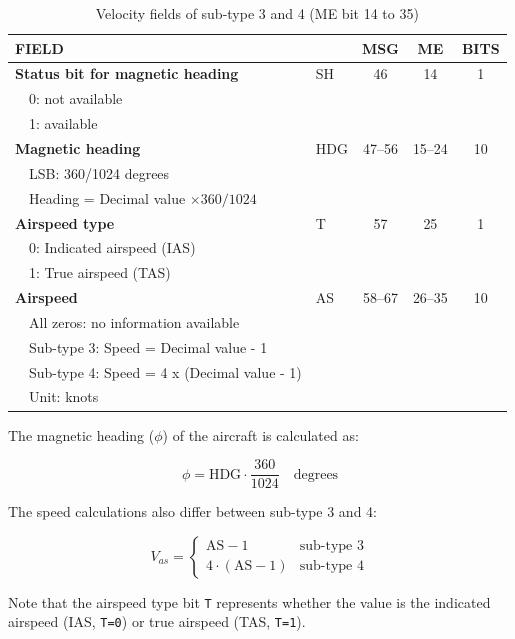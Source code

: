 \begin{table}[ht]
\caption{Velocity fields of sub-type 3 and 4 (ME bit 14 to 35)}
\label{tb:adsb-velocity-bits-14-35-as}
\footnotesize
\begin{tabular}{|l|l|c|c|c|}
\hline
\textbf{FIELD} & & \textbf{MSG} & \textbf{ME} & \textbf{BITS} \\ \hline
\textbf{Status bit for magnetic heading}  & SH & 46 & 14 & 1\\
~~0: not available &&&& \\
~~1: available &&&& \\ \hline
\textbf{Magnetic heading} & HDG & 47--56 & 15--24 & 10 \\
~~LSB: 360/1024 degrees &&&& \\
~~Heading = Decimal value $\times 360 / 1024$ &&&& \\ \hline
\textbf{Airspeed type} & T & 57 & 25 & 1\\
~~0: Indicated airspeed (IAS) &&&& \\
~~1: True airspeed (TAS) &&&& \\ \hline
\textbf{Airspeed} & AS & 58--67 & 26--35 & 10 \\
~~All zeros: no information available &&&& \\
~~Sub-type 3: Speed = Decimal value - 1 &&&& \\
~~Sub-type 4: Speed = 4 x (Decimal value - 1) &&&& \\
~~Unit: knots &&&& \\ \hline
\end{tabular}
\end{table}


The magnetic heading ($\phi$) of the aircraft is calculated as:

\begin{equation}
  \phi = \mathrm{HDG} \cdot \frac{360}{1024}  \quad \text{degrees}
\end{equation}

The speed calculations also differ between sub-type 3 and 4:

\begin{equation}
  V_{as} =
  \begin{cases}
    \mathrm{AS} - 1     & \text{sub-type 3} \\
    4 \cdot (\mathrm{AS} - 1)     & \text{sub-type 4}
  \end{cases}
\end{equation}


Note that the airspeed type bit \texttt{T} represents whether the value is the indicated airspeed (IAS, \texttt{T=0}) or true airspeed (TAS, \texttt{T=1}).


